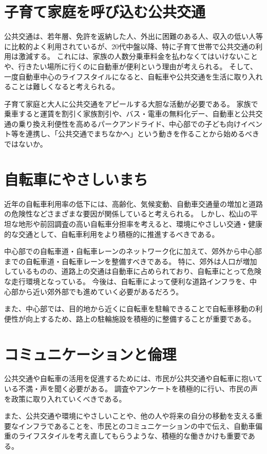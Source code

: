\documentclass[a4paper,12pt, uplatex]{jsbook}
\begin{document}
\section{子育て家庭を呼び込む公共交通}
公共交通は、若年層、免許を返納した人、外出に困難のある人、収入の低い人等に比較的よく利用されているが、20代中盤以降、特に子育て世帯で公共交通の利用は激減する。
これには、家族の人数分乗車料金を払わなくてはいけないことや、行きたい場所に行くのに自動車が便利という理由が考えられる。
そして、一度自動車中心のライフスタイルになると、自転車や公共交通を生活に取り入れることは難しくなると考えられる。

子育て家庭と大人に公共交通をアピールする大胆な活動が必要である。
家族で乗車すると運賃を割引く家族割引や、バス・電車の無料化デー、自動車と公共交通の乗り換え利便性を高めるパークアンドライド、中心部での子ども向けイベント等を連携し、「公共交通でまちなかへ」という動きを作ることから始めるべきではないか。

\section{自転車にやさしいまち}
近年の自転車利用率の低下には、高齢化、気候変動、自動車交通量の増加と道路の危険性などさまざまな要因が関係していると考えられる。
しかし、松山の平坦な地形や前回調査の高い自転車分担率を考えると、環境にやさしい交通・健康的な交通として、自転車利用をより積極的に推進するべきである。

中心部での自転車道・自転車レーンのネットワーク化に加えて、郊外から中心部までの自転車道・自転車レーンを整備すべきである。
特に、郊外は人口が増加しているものの、道路上の交通は自動車に占められており、自転車にとって危険な走行環境となっている。
今後は、自転車によって便利な道路インフラを、中心部から近い郊外部でも進めていく必要があるだろう。

また、中心部では、目的地から近くに自転車を駐輪できることで自転車移動の利便性が向上するため、路上の駐輪施設を積極的に整備することが重要である。

\section{コミュニケーションと倫理}
公共交通や自転車の活用を促進するためには、市民が公共交通や自転車に抱いている不満・声を聞く必要がある。
調査やアンケートを積極的に行い、市民の声を政策に取り入れていくべきである。

また、公共交通や環境にやさしいことや、他の人や将来の自分の移動を支える重要なインフラであることを、市民とのコミュニケーションの中で伝え、自動車偏重のライフスタイルを考え直してもらうような、積極的な働きかけも重要である。
\end{document}
